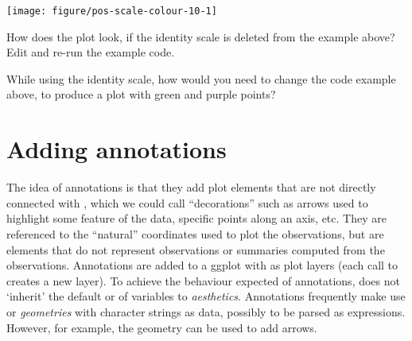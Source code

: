 \documentclass[krantz2]{krantz}\usepackage{knitr}%
\begin{document}
\begin{knitrout}\footnotesize
{}\color{fgcolor}\begin{kframe}
\begin{alltt}
 \hlkwb{<-} \hlstd{(} \hlstd{=} \hlopt{:}\hlstd{,}  \hlstd{=} \hlstd{(}\hlstd{),}  \hlstd{=} \hlstd{(}\hlstd{(}\hlstd{,} \hlstd{),} \hlstd{))}

    \hlopt{+}
  \hlstd{()} \hlopt{+}
  \hlstd{()}
\end{alltt}
\end{kframe}

{\centering \texttt{[image: figure/pos-scale-colour-10-1]} 

}



\end{knitrout}

\begin{playground}
How does the plot look, if the identity scale is deleted from the example above? Edit and re-run the example code.

While using the identity scale, how would you need to change the code example above, to produce a plot with green and purple points?
\end{playground}

\section{Adding annotations}\label{sec:plot:annotations}
The idea of annotations is that they add plot elements that are not directly connected with , which we could call ``decorations'' such as arrows used to highlight some feature of the data, specific points along an axis, etc. They are referenced to the ``natural'' coordinates used to plot the observations, but are elements that do not represent observations or summaries computed from the observations.  Annotations are added to a ggplot with  as plot layers (each call to  creates a new layer). To achieve the behaviour expected of annotations,  does not `inherit' the default  or  of variables to \emph{aesthetics}. Annotations frequently make use  or  \emph{geometries} with character strings as data, possibly to be parsed as expressions. However, for example, the  geometry can be used to add arrows.
\end{document}
